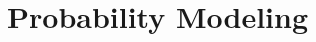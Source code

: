 \documentclass{amsart}
\theoremstyle{definition}
\theoremstyle{remark}
\numberwithin{equation}{section}
\begin{document}

\section{Probability Modeling}
\end{document}
